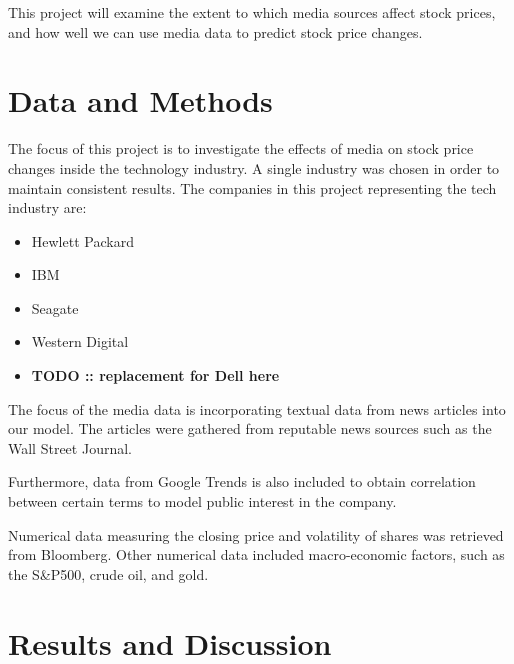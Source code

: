 \documentclass{article}
\begin{document}
This project will examine the extent to which media sources affect stock prices, and how well we can use media data to predict stock price changes. 

\newpage 

\section{Data and Methods}

The focus of this project is to investigate the effects of media on stock price changes inside the technology industry. A single industry was chosen in order to maintain consistent results. The companies in this project representing the tech industry are: \begin{itemize}
\item Hewlett Packard
\item IBM
\item Seagate
\item Western Digital
\item \textbf{TODO :: replacement for Dell here}
\end{itemize}

The focus of the media data is incorporating textual data from news articles into our model. The articles were gathered from reputable news sources such as the Wall Street Journal. 

Furthermore, data from Google Trends is also included to obtain correlation between certain terms to model public interest in the company.  

Numerical data measuring the closing price and volatility of shares was retrieved from Bloomberg. Other numerical data included macro-economic factors, such as the S\&P500, crude oil, and gold. 

\section{Results and Discussion}
\end{document}
